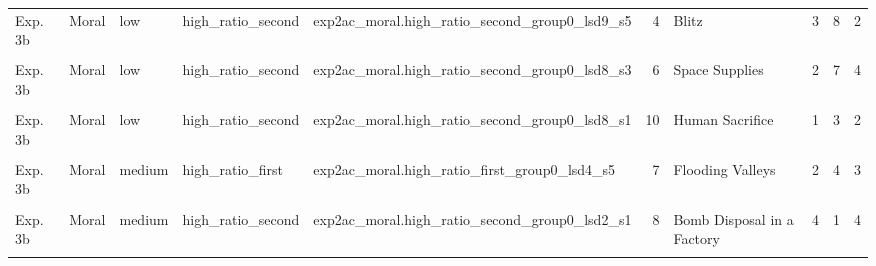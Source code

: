 \documentclass[
]{article}
\begin{document}
\begin{longtable}[t]{lllllrlrrr}
Exp. 3b & Moral & low & high\_ratio\_second & exp2ac\_moral.high\_ratio\_second\_group0\_lsd9\_s5 & 4 & Blitz & 3 & 8 & 2\\
\addlinespace
\cellcolor{gray!10}{Exp. 3b} & \cellcolor{gray!10}{Moral} & \cellcolor{gray!10}{low} & \cellcolor{gray!10}{high\_ratio\_second} & \cellcolor{gray!10}{exp2ac\_moral.high\_ratio\_second\_group0\_lsd7\_s1} & \cellcolor{gray!10}{6} & \cellcolor{gray!10}{Space Supplies} & \cellcolor{gray!10}{2} & \cellcolor{gray!10}{2} & \cellcolor{gray!10}{4}\\
Exp. 3b & Moral & low & high\_ratio\_second & exp2ac\_moral.high\_ratio\_second\_group0\_lsd8\_s3 & 6 & Space Supplies & 2 & 7 & 4\\
\cellcolor{gray!10}{Exp. 3b} & \cellcolor{gray!10}{Moral} & \cellcolor{gray!10}{low} & \cellcolor{gray!10}{high\_ratio\_second} & \cellcolor{gray!10}{exp2ac\_moral.high\_ratio\_second\_group0\_lsd9\_s2} & \cellcolor{gray!10}{7} & \cellcolor{gray!10}{Flooding Valleys} & \cellcolor{gray!10}{1} & \cellcolor{gray!10}{1} & \cellcolor{gray!10}{4}\\
Exp. 3b & Moral & low & high\_ratio\_second & exp2ac\_moral.high\_ratio\_second\_group0\_lsd8\_s1 & 10 & Human Sacrifice & 1 & 3 & 2\\
\cellcolor{gray!10}{Exp. 3b} & \cellcolor{gray!10}{Moral} & \cellcolor{gray!10}{medium} & \cellcolor{gray!10}{high\_ratio\_first} & \cellcolor{gray!10}{exp2ac\_moral.high\_ratio\_first\_group0\_lsd2\_s3} & \cellcolor{gray!10}{7} & \cellcolor{gray!10}{Flooding Valleys} & \cellcolor{gray!10}{2} & \cellcolor{gray!10}{4} & \cellcolor{gray!10}{4}\\
\addlinespace
Exp. 3b & Moral & medium & high\_ratio\_first & exp2ac\_moral.high\_ratio\_first\_group0\_lsd4\_s5 & 7 & Flooding Valleys & 2 & 4 & 3\\
\cellcolor{gray!10}{Exp. 3b} & \cellcolor{gray!10}{Moral} & \cellcolor{gray!10}{medium} & \cellcolor{gray!10}{high\_ratio\_first} & \cellcolor{gray!10}{exp2ac\_moral.high\_ratio\_first\_group0\_lsd6\_s1} & \cellcolor{gray!10}{3} & \cellcolor{gray!10}{Fuming Hospital} & \cellcolor{gray!10}{1} & \cellcolor{gray!10}{5} & \cellcolor{gray!10}{2}\\
Exp. 3b & Moral & medium & high\_ratio\_second & exp2ac\_moral.high\_ratio\_second\_group0\_lsd2\_s1 & 8 & Bomb Disposal in a Factory & 4 & 1 & 4\\
\cellcolor{gray!10}{Exp. 3b} & \cellcolor{gray!10}{Moral} & \cellcolor{gray!10}{medium} & \cellcolor{gray!10}{high\_ratio\_second} & \cellcolor{gray!10}{exp2ac\_moral.high\_ratio\_second\_group0\_lsd3\_s1} & \cellcolor{gray!10}{8} & \cellcolor{gray!10}{Bomb Disposal in a Factory} & \cellcolor{gray!10}{4} & \cellcolor{gray!10}{1} & \cellcolor{gray!10}{4}\\

\end{longtable}
\end{document}
